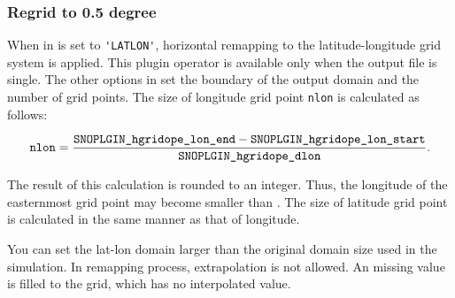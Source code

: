 \subsubsection{Regrid to 0.5 degree}


When  in  is set to \verb|'LATLON'|, horizontal remapping to the latitude-longitude grid system is applied. This plugin operator is available only when the output file is single.
The other options in  set the boundary of the output domain and the number of grid points. The size of longitude grid point \verb|nlon| is calculated as follows:

\begin{eqnarray}
  \nmitemeq{nlon} = \frac{\nmitemeq{SNOPLGIN_hgridope_lon_end} - \nmitemeq{SNOPLGIN_hgridope_lon_start} }{\nmitemeq{SNOPLGIN_hgridope_dlon}} \nonumber.
\end{eqnarray}

The result of this calculation is rounded to an integer. Thus, the longitude of the easternmost grid point may become smaller than .
The size of latitude grid point is calculated in the same manner as that of longitude.

You can set the lat-lon domain larger than the original domain size used in the simulation. In remapping process, extrapolation is not allowed. An missing value is filled to the grid, which has no interpolated value.
